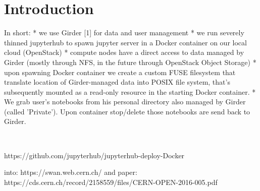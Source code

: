 \documentclass[conference]{IEEEtran}
\begin{document}
%
\IEEEpeerreviewmaketitle

\section{Introduction}
In short:
 * we use Girder [1] for data and user management
 * we run severely thinned jupyterhub to spawn jupyter server in a
 Docker container on our local cloud (OpenStack)
 * compute nodes have a direct access to data managed by Girder (mostly
 through NFS, in the future through OpenStack Object Storage)
 * upon spawning Docker container we create a custom FUSE filesystem
 that translate location of Girder-managed data into POSIX file system,
 that's subsequently mounted as a read-only resource in the starting
 Docker container.
 * We grab user's notebooks from his personal directory also managed by
 Girder (called 'Private'). Upon container stop/delete those notebooks
 are send back to Girder.

~\cite{stodden14}
~\cite{swan}
~\cite{yt}

https://github.com/jupyterhub/jupyterhub-deploy-Docker

into: https://swan.web.cern.ch/ and paper:
https://cds.cern.ch/record/2158559/files/CERN-OPEN-2016-005.pdf
\end{document}
